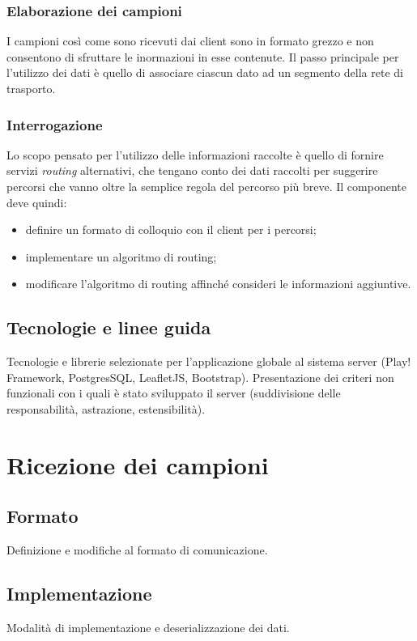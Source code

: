\documentclass[a4paper, 12pt, twoside, openright]{book}
\begin{document}
\subsection{Elaborazione dei campioni}
I campioni così come sono ricevuti dai client sono in formato grezzo e non consentono di sfruttare le inormazioni in esse contenute. Il passo principale per l'utilizzo dei dati è quello di associare ciascun dato ad un segmento della rete di trasporto. 
\subsection{Interrogazione}
Lo scopo pensato per l'utilizzo delle informazioni raccolte è quello di fornire servizi \emph{routing} alternativi, che tengano conto dei dati raccolti per suggerire percorsi che vanno oltre la semplice regola del percorso più breve. Il componente deve quindi:
\begin{itemize}
\item definire un formato di colloquio con il client per i percorsi;
\item implementare un algoritmo di routing;
\item modificare l'algoritmo di routing affinché consideri le informazioni aggiuntive.
\end{itemize}

\section{Tecnologie e linee guida}
Tecnologie e librerie selezionate per l'applicazione globale al sistema server (Play! Framework, PostgresSQL, LeafletJS, Bootstrap). Presentazione dei criteri non funzionali con i quali è stato sviluppato il server (suddivisione delle responsabilità, astrazione, estensibilità).

\chapter{Ricezione dei campioni} %
\section{Formato}
Definizione e modifiche al formato di comunicazione.
\section{Implementazione}
Modalità di implementazione e deserializzazione dei dati.
\end{document}
